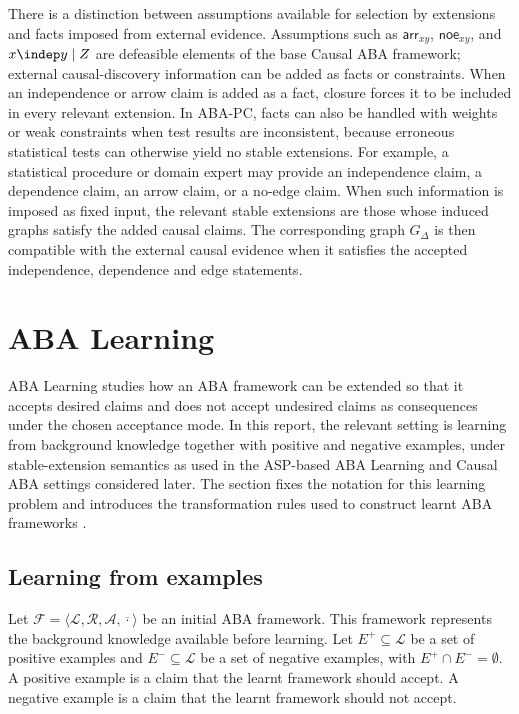 There is a distinction between assumptions available for selection by extensions and facts imposed from external evidence. Assumptions such as \(\mathsf{arr}_{xy}\), \(\mathsf{noe}_{xy}\), and \(x \indep y \mid Z\) are defeasible elements of the base Causal ABA framework; external causal-discovery information can be added as facts or constraints. When an independence or arrow claim is added as a fact, closure forces it to be included in every relevant extension. In ABA-PC, facts can also be handled with weights or weak constraints when test results are inconsistent, because erroneous statistical tests can otherwise yield no stable extensions. For example, a statistical procedure or domain expert may provide an independence claim, a dependence claim, an arrow claim, or a no-edge claim. When such information is imposed as fixed input, the relevant stable extensions are those whose induced graphs satisfy the added causal claims. The corresponding graph \(G_{\Delta}\) is then compatible with the external causal evidence when it satisfies the accepted independence, dependence and edge statements.

\section{ABA Learning}

ABA Learning studies how an ABA framework can be extended so that it accepts desired claims and does not accept undesired claims as consequences under the chosen acceptance mode. In this report, the relevant setting is learning from background knowledge together with positive and negative examples, under stable-extension semantics as used in the ASP-based ABA Learning and Causal ABA settings considered later. The section fixes the notation for this learning problem and introduces the transformation rules used to construct learnt ABA frameworks \cite{proietti2022learning,de2023aba}.

\subsection{Learning from examples}

Let \(\mathcal{F} = \langle \mathcal{L}, \mathcal{R}, \mathcal{A}, \overline{\cdot} \rangle\) be an initial ABA framework. This framework represents the background knowledge available before learning. Let \(E^+ \subseteq \mathcal{L}\) be a set of positive examples and \(E^- \subseteq \mathcal{L}\) be a set of negative examples, with \(E^+ \cap E^- = \emptyset\). A positive example is a claim that the learnt framework should accept. A negative example is a claim that the learnt framework should not accept.

